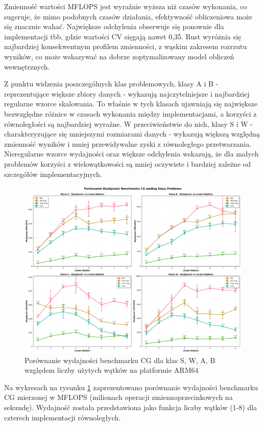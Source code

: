 Zmienność wartości MFLOPS jest wyraźnie wyższa niż czasów wykonania, co sugeruje, że mimo podobnych czasów działania, efektywność obliczeniowa może się znacznie wahać. Największe odchylenia obserwuje się ponownie dla implementacji tbb, gdzie wartości CV sięgają nawet 0,35. Rust wyróżnia się najbardziej konsekwentnym profilem zmienności, z wąskim zakresem rozrzutu wyników, co może wskazywać na dobrze zoptymalizowany model obliczeń wewnętrznych.

Z punktu widzenia poszczególnych klas problemowych, klasy A i B - reprezentujące większe zbiory danych - wykazują najczytelniejsze i najbardziej regularne wzorce skalowania. To właśnie w tych klasach ujawniają się największe bezwzględne różnice w czasach wykonania między implementacjami, a korzyści z równoległości są najbardziej wyraźne. W przeciwieństwie do nich, klasy S i W - charakteryzujące się mniejszymi rozmiarami danych - wykazują większą względną zmienność wyników i mniej przewidywalne zyski z równoległego przetwarzania. Nieregularne wzorce wydajności oraz większe odchylenia wskazują, że dla małych problemów korzyści z wielowątkowości są mniej oczywiste i bardziej zależne od szczegółów implementacyjnych.

\begin{figure}[H]
    \centering
    \includegraphics[width=\textwidth]{analiza/images/parallel/cg/arm/cg_porownanie_wydajnosci.png}
    \caption{Porównanie wydajności benchmarku CG dla klas S, W, A, B względem liczby użytych wątków na platformie ARM64}
    \label{cg_porownanie_wydajnosci}
\end{figure}
Na wykresach na rysunku \ref{cg_porownanie_wydajnosci} zaprezentowano porównanie wydajności benchmarku CG mierzonej w MFLOPS (milionach operacji zmiennoprzecinkowych na sekundę). Wydajność została przedstawiona jako funkcja liczby wątków (1-8) dla czterech implementacji równoległych.

